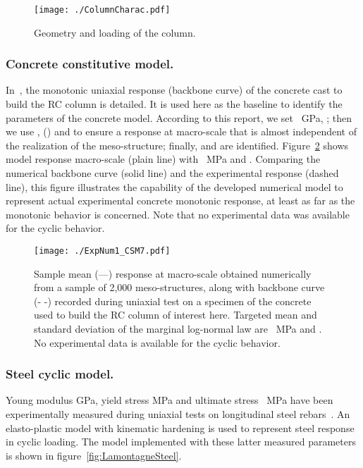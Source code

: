 \documentclass[12p]{amsart}
\begin{document}
\begin{figure}[htb]
\begin{center}
 \texttt{[image: ./ColumnCharac.pdf]}
\caption{Geometry and loading of the column.}
\label{fig:ColCha}
\end{center}
\end{figure}


\subsubsection{Concrete constitutive model.}

In~\cite{Lamontagne1997}, the monotonic uniaxial response (backbone curve) of the concrete cast to build the RC column is detailed. It is used here as the baseline to identify the parameters of the concrete model. According to this report, we set ~GPa, ; then we use ,  () and  to ensure a response at macro-scale that is almost independent of the realization of the meso-structure; finally,  and  are identified. Figure~\ref{fig:2000} shows model response macro-scale (plain line) with ~MPa and . Comparing the numerical backbone curve (solid line) and the experimental response (dashed line), this figure illustrates the capability of the developed numerical model to represent actual experimental concrete monotonic response, at least as far as the monotonic behavior is concerned. Note that no experimental data was available for the cyclic behavior.

\begin{figure}[htb]
\begin{center}
 \texttt{[image: ./ExpNum1\_CSM7.pdf]}
\caption{Sample mean (---) response at macro-scale obtained numerically from a sample of 2,000 meso-structures, along with backbone curve (- -) recorded during uniaxial test on a specimen of the concrete used to build the RC column of interest here. Targeted mean and standard deviation of the marginal log-normal law are ~MPa and . No experimental data is available for the cyclic behavior.}
\label{fig:2000}
\end{center}
\end{figure}


\subsubsection{Steel cyclic model.}

Young modulus  GPa, yield stress  MPa and ultimate stress ~MPa have been experimentally measured during uniaxial tests on longitudinal steel rebars~\cite{Lamontagne1997}. An elasto-plastic model with kinematic hardening is used to represent steel response in cyclic loading. The model implemented with these latter measured parameters is shown in figure~\ref{fig:LamontagneSteel}.
\end{document}
